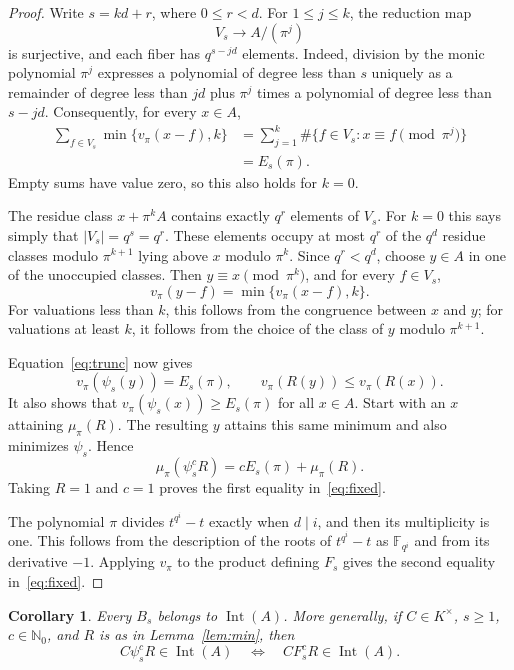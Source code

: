 \documentclass[11pt]{article}
\newtheorem{corollary}[theorem]{Corollary}
\theoremstyle{remark}
\newcommand{\Int}{\operatorname{Int}}
\newcommand{\F}{\mathbb F}
\newcommand{\Nzero}{\mathbb N_0}
\begin{document}
\begin{proof}
Write $s=kd+r$, where $0\leq r<d$. For $1\leq j\leq k$, the reduction map
\[
 V_s\longrightarrow A/(\pi^j)
\]
is surjective, and each fiber has $q^{s-jd}$ elements. Indeed, division by the monic polynomial $\pi^j$ expresses a polynomial of degree less than $s$ uniquely as a remainder of degree less than $jd$ plus $\pi^j$ times a polynomial of degree less than $s-jd$. Consequently, for every $x\in A$,
\begin{equation}\label{eq:trunc}
 \begin{split}
 \sum_{f\in V_s}\min\{v_\pi(x-f),k\}
 &=\sum_{j=1}^k\#\{f\in V_s:x\equiv f\pmod{\pi^j}\}\\
 &=E_s(\pi).
 \end{split}
\end{equation}
Empty sums have value zero, so this also holds for $k=0$.

The residue class $x+\pi^kA$ contains exactly $q^r$ elements of $V_s$. For $k=0$ this says simply that $|V_s|=q^s=q^r$. These elements occupy at most $q^r$ of the $q^d$ residue classes modulo $\pi^{k+1}$ lying above $x$ modulo $\pi^k$. Since $q^r<q^d$, choose $y\in A$ in one of the unoccupied classes. Then $y\equiv x\pmod{\pi^k}$, and for every $f\in V_s$,
\begin{equation}\label{eq:simultaneous}
 v_\pi(y-f)=\min\{v_\pi(x-f),k\}.
\end{equation}
For valuations less than $k$, this follows from the congruence between $x$ and $y$; for valuations at least $k$, it follows from the choice of the class of $y$ modulo $\pi^{k+1}$.

Equation~\eqref{eq:trunc} now gives
\[
 v_\pi(\psi_s(y))=E_s(\pi),
 \qquad v_\pi(R(y))\leq v_\pi(R(x)).
\]
It also shows that $v_\pi(\psi_s(x))\geq E_s(\pi)$ for all $x\in A$. Start with an $x$ attaining $\mu_\pi(R)$. The resulting $y$ attains this same minimum and also minimizes $\psi_s$. Hence
\[
 \mu_\pi(\psi_s^cR)=cE_s(\pi)+\mu_\pi(R).
\]
Taking $R=1$ and $c=1$ proves the first equality in~\eqref{eq:fixed}.

The polynomial $\pi$ divides $t^{q^i}-t$ exactly when $d\mid i$, and then its multiplicity is one. This follows from the description of the roots of $t^{q^i}-t$ as $\F_{q^i}$ and from its derivative $-1$. Applying $v_\pi$ to the product defining $F_s$ gives the second equality in~\eqref{eq:fixed}.
\end{proof}

\begin{corollary}\label{cor:criterion}
Every $B_s$ belongs to $\Int(A)$. More generally, if $C\in K^\times$, $s\geq1$, $c\in\Nzero$, and $R$ is as in Lemma~\ref{lem:min}, then
\begin{equation}\label{eq:criterion}
 C\psi_s^cR\in\Int(A)
 \quad\Longleftrightarrow\quad
 CF_s^cR\in\Int(A).
\end{equation}
\end{corollary}
\end{document}
